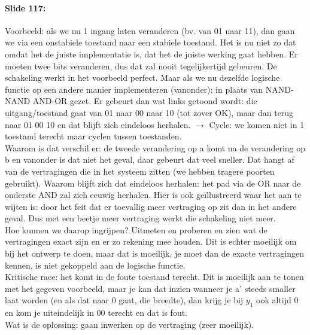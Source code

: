 \documentclass[10pt,a4paper]{book}
\begin{document}
\paragraph{Slide 117:} Voorbeeld: als we nu 1 ingang laten veranderen (bv. van 01 naar 11), dan gaan we via een onstabiele toestand naar een stabiele toestand. Het is nu niet zo dat omdat het de juiste implementatie is, dat het de juiste werking gaat hebben. Er moeten twee bits veranderen, dus dat zal nooit tegelijkertijd gebeuren. De schakeling werkt in het voorbeeld perfect. Maar als we nu dezelfde logische functie op een andere manier implementeren (vanonder): in plaats van NAND-NAND AND-OR gezet. Er gebeurt dan wat links getoond wordt: die uitgang/toestand gaat van 01 naar 00 naar 10 (tot zover OK), maar dan terug naar 01 00 10 en dat blijft zich eindeloos herhalen. $\rightarrow$ Cycle: we komen niet in 1 toestand terecht maar cyclen tussen toestanden.\\
Waarom is dat verschil er: de tweede verandering op a komt na de verandering op b en vanonder is dat niet het geval, daar gebeurt dat veel sneller. Dat hangt af van de vertragingen die in het systeem zitten (we hebben tragere poorten gebruikt). Waarom blijft zich dat eindeloos herhalen: het pad via de OR naar de onderste AND zal zich eeuwig herhalen. Hier is ook ge\"illustreerd waar het aan te wijten is: door het feit dat er toevallig meer vertraging op zit dan in het andere geval. Dus met een beetje meer vertraging werkt die schakeling niet meer.\\
Hoe kunnen we daarop ingrijpen? Uitmeten en proberen en zien wat de vertragingen exact zijn en er zo rekening mee houden. Dit is echter moeilijk om bij het ontwerp te doen, maar dat is moeilijk, je moet dan de exacte vertragingen kennen, is niet gekoppeld aan de logische functie.\\
Kritische race: het komt in de foute toestand terecht. Dit is moeilijk aan te tonen met het gegeven voorbeeld, maar je kan dat inzien wanneer je a' steeds smaller laat worden (en als dat naar 0 gaat, die breedte), dan krijg je bij $y_1$ ook altijd 0 en kom je uiteindelijk in 00 terecht en dat is fout.\\
Wat is de oplossing: gaan inwerken op de vertraging (zeer moeilijk).
\end{document}
